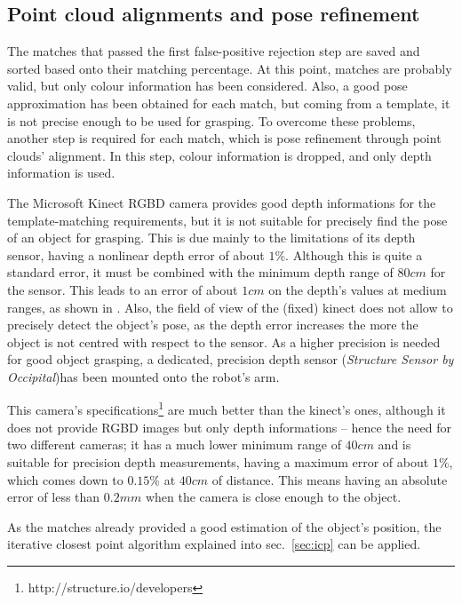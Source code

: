 \subsection{Point cloud alignments and pose refinement}
The matches that passed the first false-positive rejection step are saved and
sorted based onto their matching percentage. At this point, matches are probably
valid, but only colour information has been considered. Also, a good pose
approximation has been obtained for each match, but coming from a template, it
is not precise enough to be used for grasping. To overcome these problems,
another step is required for each match, which is pose refinement through point
clouds' alignment. In this step, colour information is dropped, and only depth
information is used. 

The Microsoft Kinect RGBD camera provides good depth informations for the template-matching
requirements, but it is not suitable for precisely find the pose of an object
for grasping. This is due mainly to the limitations of its depth sensor, having
a nonlinear depth error of about $1\%$.
Although this is quite a standard error, it must be combined with the minimum
depth range of $80\unit{cm}$ for the sensor. This leads to an error of about
$1\unit{cm}$ on the depth's values at medium ranges, as shown in \cite{kinect-evaluation}. Also, the field of view of the (fixed)
kinect does not allow to precisely detect the object's pose, as the depth error
increases the more the object is not centred with respect to the sensor. As a
higher precision is needed for good 
object grasping, a dedicated, precision depth sensor (\emph{Structure Sensor by
Occipital})has been mounted onto the robot's arm.


This camera's specifications\footnote{http://structure.io/developers} are much better than the kinect's ones, although it
does not provide RGBD images but only depth informations -- hence the need for two
different cameras; it has a much lower minimum range of $40\unit{cm}$ and is suitable for
precision depth measurements, having a maximum error of about $1\%$, which comes
down to $0.15\%$ at $40\unit{cm}$ of distance. This means having an absolute
error of less than $0.2\unit{mm}$ when the camera is close enough to the object.

As the matches already provided a good estimation of the object's position, the
iterative closest point algorithm explained into sec.~\ref{sec:icp} can be
applied. 

